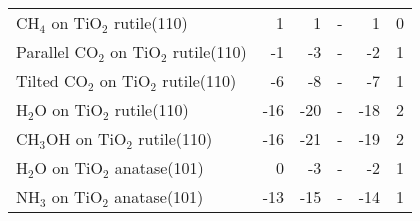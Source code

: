 \begin{table}
\begin{adjustbox}{center,max width=1\textwidth}
\begin{tabular}{lrrrrr}
CH$_4$ on TiO$_2$ rutile(110) & 1 & 1 & - & 1 & 0 \\
Parallel CO$_2$ on TiO$_2$ rutile(110) & -1 & -3 & - & -2 & 1 \\
Tilted CO$_2$ on TiO$_2$ rutile(110) & -6 & -8 & - & -7 & 1 \\
H$_2$O on TiO$_2$ rutile(110) & -16 & -20 & - & -18 & 2 \\
CH$_3$OH on TiO$_2$ rutile(110) & -16 & -21 & - & -19 & 2 \\
H$_2$O on TiO$_2$ anatase(101) & 0 & -3 & - & -2 & 1 \\
NH$_3$ on TiO$_2$ anatase(101) & -13 & -15 & - & -14 & 1 \\
\bottomrule
\end{tabular}
\end{adjustbox}
\end{table}